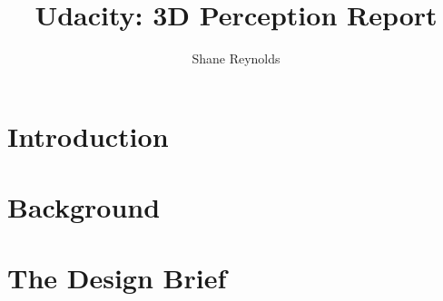 \documentclass[a4paper]{article}
\begin{document}
\title{Udacity: 3D Perception Report}
\author{Shane Reynolds}
\maketitle
\section{Introduction}


\section{Background}


\section{The Design Brief}
\end{document}
